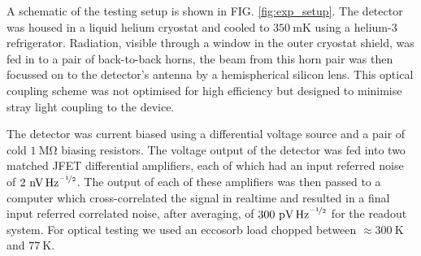 \documentclass[aip, apl, a4paper, amsmath,amssymb, reprint]{revtex4-1}
\begin{document}
A schematic of the testing setup is shown in FIG. \ref{fig:exp_setup}. The detector was housed in a liquid helium cryostat and cooled to $350~\mathrm{mK}$ using a helium-3 refrigerator. Radiation, visible through a window in the outer cryostat shield, was fed in to a pair of back-to-back horns, the beam from this horn pair was then focussed on to the detector's antenna by a hemispherical silicon lens. This optical coupling scheme was not optimised for high efficiency but designed to minimise stray light coupling to the device.

The detector was current biased using a differential voltage source and a pair of cold $1~\mathrm{M\Omega}$ biasing resistors. The voltage output of the detector was fed into two matched JFET differential amplifiers, each of which had an input referred noise of $2~\mathrm{\mbox{nV\,Hz}^{\nicefrac{-1}{2}}}$. The output of each of these amplifiers was then passed to a computer which cross-correlated the signal in realtime and resulted in a final input referred correlated noise, after averaging, of $300~\mathrm{\mbox{pV\,Hz}^{\nicefrac{-1}{2}}}$ for the readout system. For optical testing we used an eccosorb load chopped between $\approx 300~\mathrm{K}$ and $77~\mathrm{K}$.
\end{document}
